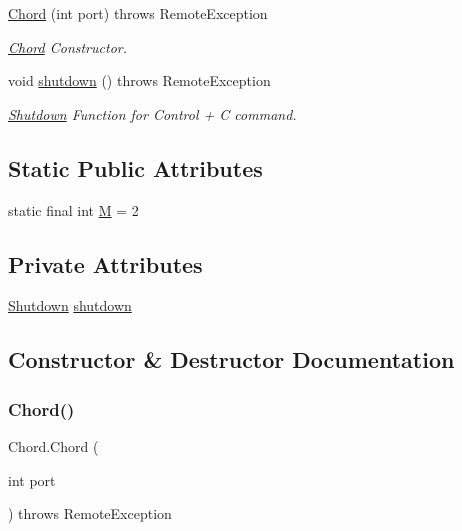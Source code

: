 \begin{DoxyCompactItemize}
\hyperlink{class_chord_aed079e86ebb63da4af055ca324a74274}{Chord} (int port)  throws Remote\+Exception 
\begin{DoxyCompactList}\small\item\em \hyperlink{class_chord}{Chord} Constructor. \end{DoxyCompactList}\item 
void \hyperlink{class_chord_a8616150947d5fa4095187325bc9f8a60}{shutdown} ()  throws Remote\+Exception 
\begin{DoxyCompactList}\small\item\em \hyperlink{class_shutdown}{Shutdown} Function for Control + C command. \end{DoxyCompactList}\end{DoxyCompactItemize}
\subsection*{Static Public Attributes}
\begin{DoxyCompactItemize}
\item 
static final int \hyperlink{class_chord_a864e0b4011dc157c78a06dd951c6d9ac}{M} = 2
\end{DoxyCompactItemize}
\subsection*{Private Attributes}
\begin{DoxyCompactItemize}
\item 
\hyperlink{class_shutdown}{Shutdown} \hyperlink{class_chord_a41961ec2d829d7a2c765fe7f8a23a64c}{shutdown}
\end{DoxyCompactItemize}


\subsection{Constructor \& Destructor Documentation}
\hypertarget{class_chord_aed079e86ebb63da4af055ca324a74274}{}\label{class_chord_aed079e86ebb63da4af055ca324a74274} 
\subsubsection{\texorpdfstring{Chord()}{Chord()}}
{\footnotesize\ttfamily Chord.\+Chord (\begin{DoxyParamCaption}\item[{int}]{port }\end{DoxyParamCaption}) throws Remote\+Exception}



